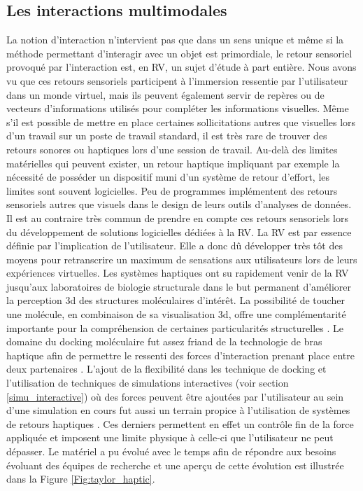 \subsection{Les interactions multimodales}

La notion d'interaction n'intervient pas que dans un sens unique et même si la méthode permettant d'interagir avec un objet est primordiale, le retour sensoriel provoqué par l'interaction est, en RV, un sujet d'étude à part entière. 
Nous avons vu que ces retours sensoriels participent à l'immersion ressentie par l'utilisateur dans un monde virtuel, mais ils peuvent également servir de repères ou de vecteurs d'informations utilisés pour compléter les informations visuelles. Même s'il est possible de mettre en place certaines sollicitations autres que visuelles lors d'un travail sur un poste de travail standard, il est très rare de trouver des retours sonores ou haptiques lors d'une session de travail. Au-delà des limites matérielles qui peuvent exister, un retour haptique impliquant par exemple la nécessité de posséder un dispositif muni d'un système de retour d'effort, les limites sont souvent logicielles. Peu de programmes implémentent des retours sensoriels autres que visuels dans le design de leurs outils d'analyses de données. Il est au contraire très commun de prendre en compte ces retours sensoriels lors du développement de solutions logicielles dédiées à la RV. La RV est par essence définie par l'implication de l'utilisateur. Elle a donc dû développer très tôt des moyens pour retranscrire un maximum de sensations aux utilisateurs lors de leurs expériences virtuelles. Les systèmes haptiques ont su rapidement venir de la RV jusqu'aux laboratoires de biologie structurale dans le but permanent d'améliorer la perception 3d des structures moléculaires d'intérêt. La possibilité de toucher une molécule, en combinaison de sa visualisation 3d, offre une complémentarité importante pour la compréhension de certaines particularités structurelles \cite{stocks2009interacting}. 
Le domaine du docking moléculaire fut assez friand de la technologie de bras haptique afin de permettre le ressenti des forces d'interaction prenant place entre deux partenaires \cite{nagata2002concept, sankaranarayanan2003role}. L'ajout de la flexibilité dans les technique de docking et l'utilisation de techniques de simulations interactives (voir section \ref{simu_interactive}) où des forces peuvent être ajoutées par l'utilisateur au sein d'une simulation en cours fut aussi un terrain propice à l'utilisation de systèmes de retours haptiques \cite{stone2001system}. Ces derniers permettent en effet un contrôle fin de la force appliquée et imposent une limite physique à celle-ci que l'utilisateur ne peut dépasser. Le matériel a pu évolué avec le temps afin de répondre aux besoins évoluant des équipes de recherche et une aperçu de cette évolution est illustrée dans la Figure \ref{Fig:taylor_haptic}.

